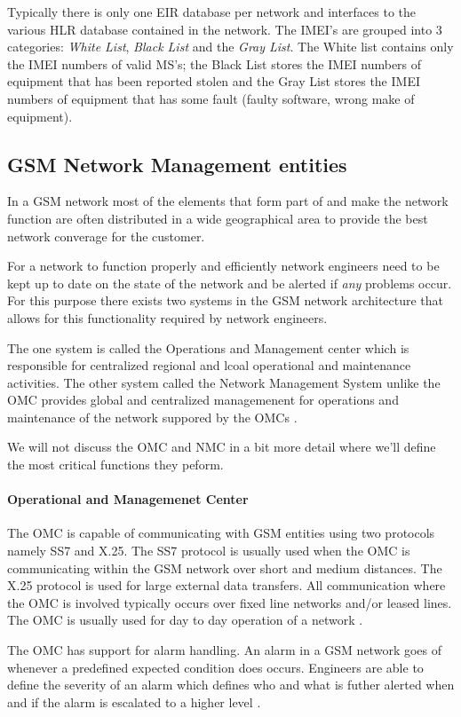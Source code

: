 Typically there is only one EIR database per network and interfaces to the various HLR database contained in the network. The IMEI's are grouped into 3 categories: \emph{White List}, \emph{Black List} and the \emph{Gray List}. The White list contains only the IMEI numbers of valid MS's; the Black List stores the IMEI numbers of equipment that has been reported stolen and the Gray List stores the IMEI numbers of equipment that has some fault (faulty software, wrong make of equipment).

\subsection{GSM Network Management entities}
In a GSM network most of the elements that form part of and make the network function are often distributed in a wide geographical area to provide the best network converage for the customer. 

For a network to function properly and efficiently network engineers need to be kept up to date on the state of the network and be alerted if \emph{any} problems occur. For this purpose there exists two systems in the GSM network architecture that allows for this functionality required by network engineers. 

The one system is called the Operations and Management center which is responsible for centralized regional and lcoal operational and maintenance activities. The other system called the Network Management System unlike the OMC provides global and centralized managemenent for operations and maintenance of the network suppored by the OMCs \cite{GSMSysEngin}.

We will not discuss the OMC and NMC in a bit more detail where we'll define the most critical functions they peform.

\paragraph{Operational and Managemenet Center}
The OMC is capable of communicating with GSM entities using two protocols namely SS7 and X.25. The SS7 protocol is usually used when the OMC is communicating within the GSM network over short and medium distances. The X.25 protocol is used for large external data transfers. All communication where the OMC is involved typically occurs over fixed line networks and/or leased lines. The OMC is usually used for day to day operation of a network \cite{GSMSysEngin}.

The OMC has support for alarm handling. An alarm in a GSM network goes of whenever a predefined expected condition does occurs. Engineers are able to define the severity of an alarm which defines who and what is futher alerted when and if the alarm is escalated to a higher level \cite{GSMSysEngin}.

